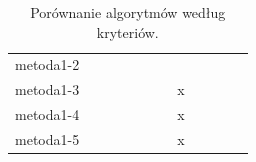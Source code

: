 \begin{table}[h!]
\begin{tabular}{|l|c|c|c|c|c|c|c|c|c|c|c|}
		metoda1-2          &                            &                          &                        &                          &                          &                     &                         &                               &                         &                                &                                       \\
		metoda1-3          &                            &                          &                        &                          &                          &                     & x                       &                               &                         &                                &                                       \\
		metoda1-4          &                            &                          &                        &                          &                          &                     & x                       &                               &                         &                                &                                       \\
		metoda1-5          &                            &                          &                        &                          &                          &                     & x                       &                               &                         &                                &                                       \\
		\hline
	\end{tabular}
	\caption{Porównanie algorytmów według kryteriów.}
	\label{tab:method_comparison}
\end{table}